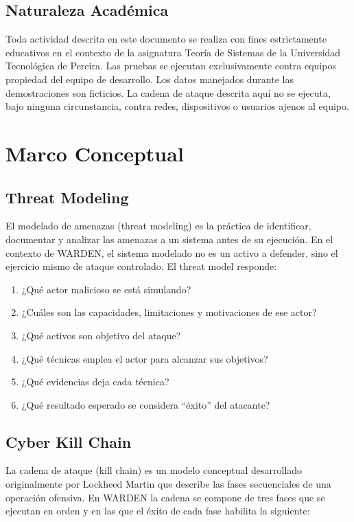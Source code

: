 \documentclass[11pt,a4paper]{article}
\begin{document}
\subsection{Naturaleza Académica}
Toda actividad descrita en este documento se realiza con fines estrictamente
educativos en el contexto de la asignatura Teoría de Sistemas de la
Universidad Tecnológica de Pereira. Las pruebas se ejecutan exclusivamente
contra equipos propiedad del equipo de desarrollo. Los datos manejados
durante las demostraciones son ficticios. La cadena de ataque descrita aquí
no se ejecuta, bajo ninguna circunstancia, contra redes, dispositivos o
usuarios ajenos al equipo.

\section{Marco Conceptual}

\subsection{Threat Modeling}
El modelado de amenazas (threat modeling) es la práctica de identificar,
documentar y analizar las amenazas a un sistema antes de su ejecución. En el
contexto de WARDEN, el sistema modelado no es un activo a defender, sino el
ejercicio mismo de ataque controlado. El threat model responde:

\begin{enumerate}
  \item ¿Qué actor malicioso se está simulando?
  \item ¿Cuáles son las capacidades, limitaciones y motivaciones de ese
    actor?
  \item ¿Qué activos son objetivo del ataque?
  \item ¿Qué técnicas emplea el actor para alcanzar sus objetivos?
  \item ¿Qué evidencias deja cada técnica?
  \item ¿Qué resultado esperado se considera ``éxito'' del atacante?
\end{enumerate}

\subsection{Cyber Kill Chain}
La cadena de ataque (kill chain) es un modelo conceptual desarrollado
originalmente por Lockheed Martin que describe las fases secuenciales de
una operación ofensiva. En WARDEN la cadena se compone de tres fases que se
ejecutan en orden y en las que el éxito de cada fase habilita la siguiente:
\end{document}
